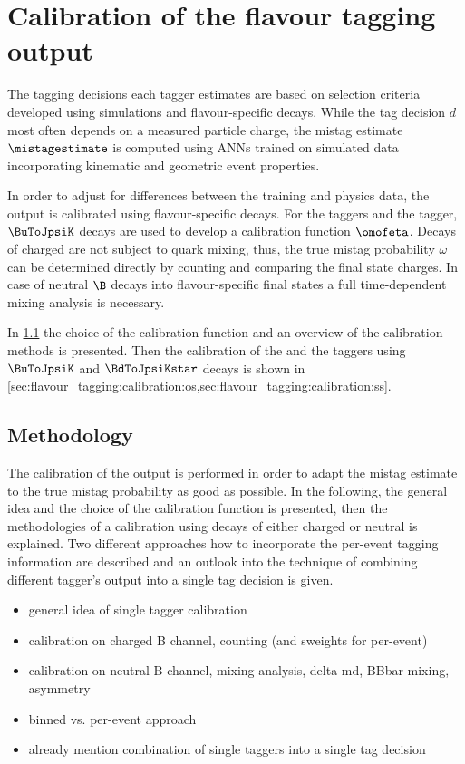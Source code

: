 \section{Calibration of the flavour tagging output}
\label{sec:flavour_tagging:calibration}

The tagging decisions each tagger estimates are based on selection criteria
developed using simulations and flavour-specific decays. While the tag decision
$d$ most often depends on a measured particle charge, the mistag estimate
$\mistagestimate$ is computed using \acp{ANN} trained on simulated data
incorporating kinematic and geometric event properties.

In order to adjust for differences between the training and physics data, the
\ANN output is calibrated using flavour-specific decays. For the \OS taggers and
the \SSpi tagger, $\BuToJpsiK$ decays are used to develop a calibration function
$\omofeta$. Decays of charged \Bmesons are not subject to quark mixing, thus,
the true mistag probability $\omega$ can be determined directly by counting and
comparing the final state charges. In case of neutral $\B$ decays into
flavour-specific final states a full time-dependent mixing analysis is
necessary.

In \cref{sec:flavour_tagging:calibration:method} the choice of the calibration
function and an overview of the calibration methods is presented. Then the
calibration of the \OS and the \SSpi taggers using $\BuToJpsiK$ and
$\BdToJpsiKstar$ decays is shown in
\cref{sec:flavour_tagging:calibration:os,sec:flavour_tagging:calibration:ss}.

\subsection{Methodology}
\label{sec:flavour_tagging:calibration:method}

The calibration of the \ANN output is performed in order to adapt the mistag
estimate to the true mistag probability as good as possible. In the following,
the general idea and the choice of the calibration function is presented, then
the methodologies of a calibration using decays of either charged or neutral
\Bmesons is explained. Two different approaches how to incorporate the per-event
tagging information are described and an outlook into the technique of combining
different tagger's output into a single tag decision is given.

\begin{itemize}
  \item general idea of single tagger calibration
  \item calibration on charged B channel, counting (and sweights for per-event)
  \item calibration on neutral B channel, mixing analysis, delta md, BBbar mixing, asymmetry
  \item binned vs. per-event approach
  \item already mention combination of single taggers into a single tag decision
\end{itemize}

